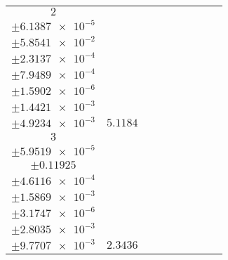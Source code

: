 \documentclass[8pt]{article}
\begin{document}
\begin{longtable}[l]{c c c c c c c c c}
$\num{2}$ & \begin{tabular}[c]{@{}c@{}}$\num{6.066e-2}$ \\ $\pm\num{6.1387e-5}$\end{tabular} & \begin{tabular}[c]{@{}c@{}}$\num{-0.31591}$ \\ $\pm\num{5.8541e-2}$\end{tabular} & \begin{tabular}[c]{@{}c@{}}$\num{-5.2052}$ \\ $\pm\num{2.3137e-4}$\end{tabular} & \begin{tabular}[c]{@{}c@{}}$\num{632.48}$ \\ $\pm\num{7.9489e-4}$\end{tabular} & \begin{tabular}[c]{@{}c@{}}$\num{1.2653}$ \\ $\pm\num{1.5902e-6}$\end{tabular} & \begin{tabular}[c]{@{}c@{}}$\num{1.1722}$ \\ $\pm\num{1.4421e-3}$\end{tabular} & \begin{tabular}[c]{@{}c@{}}$\num{4.2129}$ \\ $\pm\num{4.9234e-3}$\end{tabular} & $\num{5.1184}$\\
$\num{3}$ & \begin{tabular}[c]{@{}c@{}}$\num{2.937e-2}$ \\ $\pm\num{5.9519e-5}$\end{tabular} & \begin{tabular}[c]{@{}c@{}}$\num{0.48896}$ \\ $\pm\num{0.11925}$\end{tabular} & \begin{tabular}[c]{@{}c@{}}$\num{-1.9108}$ \\ $\pm\num{4.6116e-4}$\end{tabular} & \begin{tabular}[c]{@{}c@{}}$\num{635.77}$ \\ $\pm\num{1.5869e-3}$\end{tabular} & \begin{tabular}[c]{@{}c@{}}$\num{1.2719}$ \\ $\pm\num{3.1747e-6}$\end{tabular} & \begin{tabular}[c]{@{}c@{}}$\num{1.1354}$ \\ $\pm\num{2.8035e-3}$\end{tabular} & \begin{tabular}[c]{@{}c@{}}$\num{4.1529}$ \\ $\pm\num{9.7707e-3}$\end{tabular} & $\num{2.3436}$\\

\end{longtable}
\end{document}
